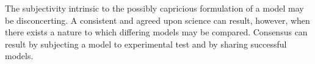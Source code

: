 {The subjectivity intrinsic to the possibly capricious formulation of a model may be disconcerting. 
A consistent and agreed upon science can result, however,
when there exists a nature to which differing models may be compared.
Consensus can result by subjecting a model to experimental test and by sharing successful models.


}
